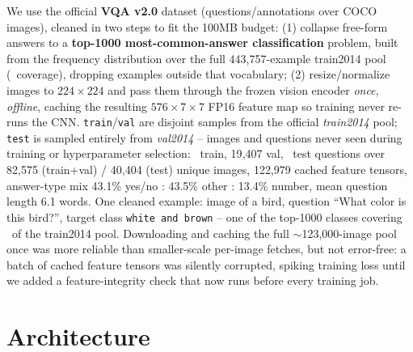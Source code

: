 \documentclass[final]{article}
\begin{document}
We use the official \textbf{VQA v2.0} dataset (questions/annotations over COCO images), cleaned in
two steps to fit the 100MB budget: (1) collapse free-form answers to a \textbf{top-1000
most-common-answer classification} problem, built from the frequency distribution over the full
443{,}757-example train2014 pool (\vocabCoverage\ coverage), dropping examples outside that
vocabulary; (2) resize/normalize images to $224\times224$ and pass them through the frozen vision
encoder \emph{once, offline}, caching the resulting $576\times7\times7$ FP16 feature map so
training never re-runs the CNN. \texttt{train}/\texttt{val} are disjoint samples from the official
\emph{train2014} pool; \texttt{test} is sampled entirely from \emph{val2014} -- images and
questions never seen during training or hyperparameter selection: \trainPoolSize\ train,
19{,}407 val, \testSetSize\ test questions over 82{,}575 (train+val) / 40{,}404 (test) unique
images, 122{,}979 cached feature tensors, answer-type mix 43.1\% yes/no : 43.5\% other : 13.4\%
number, mean question length 6.1 words. One cleaned example: image of a bird, question ``What
color is this bird?'', target class \texttt{white and brown} -- one of the top-1000 classes
covering \vocabCoverage\ of the train2014 pool. Downloading and caching the full
$\sim$123,000-image pool once was more reliable than smaller-scale per-image fetches, but not
error-free: a batch of cached feature tensors was silently corrupted, spiking training loss until
we added a feature-integrity check that now runs before every training job.

\section*{Architecture}
\end{document}
